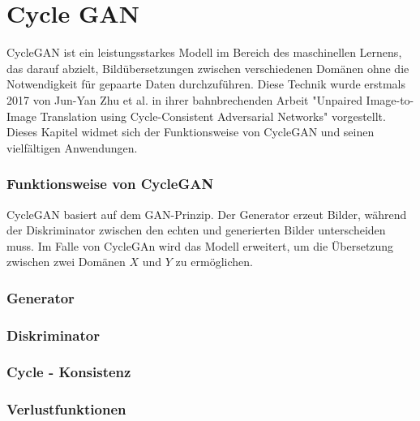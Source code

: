 \chapter*{Cycle GAN}

CycleGAN ist ein leistungsstarkes Modell im Bereich des maschinellen Lernens, das darauf abzielt, Bildübersetzungen zwischen verschiedenen Domänen ohne die Notwendigkeit für gepaarte Daten durchzuführen. Diese Technik wurde erstmals 2017 von Jun-Yan Zhu et al. in ihrer bahnbrechenden Arbeit "Unpaired Image-to-Image Translation using Cycle-Consistent Adversarial Networks" vorgestellt. Dieses Kapitel widmet sich der Funktionsweise von CycleGAN und seinen vielfältigen Anwendungen.

\subsection*{Funktionsweise von CycleGAN}

CycleGAN basiert auf dem GAN-Prinzip. Der Generator erzeut Bilder, während der Diskriminator zwischen den echten und generierten Bilder unterscheiden muss. Im Falle von CycleGAn wird das Modell erweitert, um die Übersetzung zwischen zwei Domänen $X$ und $Y$ zu ermöglichen. 

\subsection*{Generator}

\subsection*{Diskriminator}

\subsection*{Cycle - Konsistenz}

\subsection*{Verlustfunktionen}
